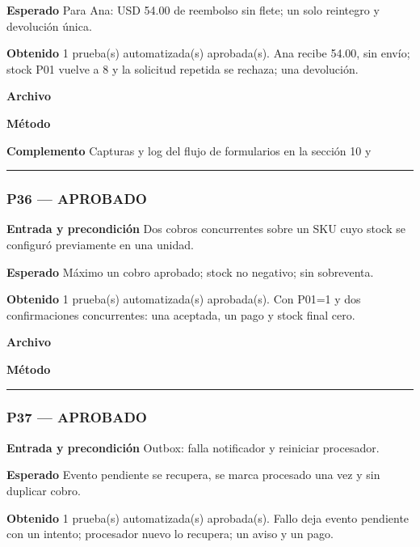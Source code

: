 \textbf{Esperado} Para Ana: USD 54.00 de reembolso sin flete; un solo reintegro y devolución única.

\textbf{Obtenido} 1 prueba(s) automatizada(s) aprobada(s). Ana recibe 54.00, sin envío; stock P01 vuelve a 8 y la solicitud repetida se rechaza; una devolución.

\textbf{Archivo} \href{https://github.com/Alan77-bot/LogiMarket360Alan/blob/68bda51063441415524ede51bdf61649ee9b4973/tests/LogiMarket.Tests/Aplicacion/DevolucionesTests.cs}{}

\textbf{Método} 

\textbf{Complemento} Capturas y log del flujo de formularios en la sección 10 y 

\medskip\hrule\medskip
\subsubsection*{P36 --- APROBADO}
\textbf{Entrada y precondición} Dos cobros concurrentes sobre un SKU cuyo stock se configuró previamente en una unidad.

\textbf{Esperado} Máximo un cobro aprobado; stock no negativo; sin sobreventa.

\textbf{Obtenido} 1 prueba(s) automatizada(s) aprobada(s). Con P01=1 y dos confirmaciones concurrentes: una aceptada, un pago y stock final cero.

\textbf{Archivo} \href{https://github.com/Alan77-bot/LogiMarket360Alan/blob/68bda51063441415524ede51bdf61649ee9b4973/tests/LogiMarket.Tests/Integracion/ConcurrenciaTests.cs}{}

\textbf{Método} 

\medskip\hrule\medskip
\subsubsection*{P37 --- APROBADO}
\textbf{Entrada y precondición} Outbox: falla notificador y reiniciar procesador.

\textbf{Esperado} Evento pendiente se recupera, se marca procesado una vez y sin duplicar cobro.

\textbf{Obtenido} 1 prueba(s) automatizada(s) aprobada(s). Fallo deja evento pendiente con un intento; procesador nuevo lo recupera; un aviso y un pago.


